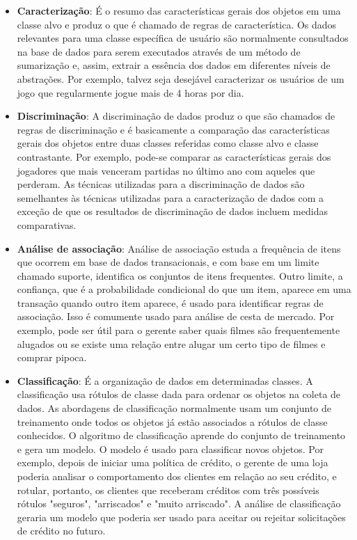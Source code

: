 \begin{itemize}
  \item 
\textbf{Caracterização}: É o resumo das características gerais dos objetos em uma classe alvo e produz o que é chamado de regras de característica. Os dados relevantes para uma classe específica de usuário são normalmente consultados na base de dados para serem executados através de um método de sumarização e, assim, extrair a essência dos dados em diferentes níveis de abstrações. Por exemplo, talvez seja desejável caracterizar os usuários de um jogo que regularmente jogue mais de 4 horas por dia.  
  \item 
\textbf{Discriminação}: A discriminação de dados produz o que são chamados de regras de discriminação e é basicamente a comparação das características gerais dos objetos entre duas classes referidas como classe alvo e classe contrastante. Por exemplo, pode-se comparar as características gerais dos jogadores que mais venceram partidas no último ano com aqueles que perderam. As técnicas utilizadas para a discriminação de dados são semelhantes às técnicas utilizadas para a caracterização de dados com a exceção de que os resultados de discriminação de dados incluem medidas comparativas.  
  \item 
\textbf{Análise de associação}: Análise de associação estuda a frequência de itens que ocorrem em base de dados transacionais, e com base em um limite chamado suporte, identifica os conjuntos de itens frequentes. Outro limite, a confiança, que é a probabilidade condicional do que um item, aparece em uma transação quando outro item aparece, é usado para identificar regras de associação. Isso é comumente usado para análise de cesta de mercado. Por exemplo, pode ser útil para o gerente saber quais filmes são frequentemente alugados ou se existe uma relação entre alugar um certo tipo de filmes e comprar pipoca.  
  \item 
\textbf{Classificação}: É a organização de dados em determinadas classes. A classificação usa rótulos de classe dada para ordenar os objetos na coleta de dados. As abordagens de classificação normalmente usam um conjunto de treinamento onde todos os objetos já estão associados a rótulos de classe conhecidos. O algoritmo de classificação aprende do conjunto de treinamento e gera um modelo. O modelo é usado para classificar novos objetos. Por exemplo, depois de iniciar uma política de crédito, o gerente de uma loja poderia analisar o comportamento dos clientes em relação ao seu crédito, e rotular, portanto, os clientes que receberam créditos com três possíveis rótulos "seguros", "arriscados" e "muito arriscado". A análise de classificação geraria um modelo que poderia ser usado para aceitar ou rejeitar solicitações de crédito no futuro.  

\end{itemize}
